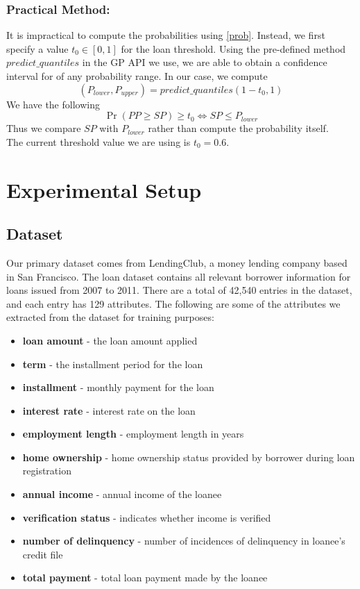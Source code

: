 \documentclass[a4paper]{article}
\theoremstyle{genius}
\begin{document}
\subsubsection{Practical Method:} It is impractical to compute the probabilities using \eqref{prob}. Instead, we first specify a value $t_0\in [0, 1]$ for the loan threshold. Using the pre-defined method $predict\_quantiles$ in the GP API we use, we are able to obtain a confidence interval for of any probability range. In our case, we compute
$$(P_{lower}, P_{upper}) = predict\_quantiles(1-t_0, 1)$$
We have the following
$$\Pr(PP \ge SP)\ge t_0 \iff SP\le P_{lower}$$
Thus we compare $SP$ with $P_{lower}$ rather than compute the probability itself.\\
The current threshold value we are using is $t_0 = 0.6$.

\section{Experimental Setup}
\subsection{Dataset}
Our primary dataset comes from LendingClub, a money lending company based in San Francisco. The loan dataset contains all relevant borrower information for loans issued from 2007 to 2011. There are a total of 42,540 entries in the dataset, and each entry has 129 attributes. The following are some of the attributes we extracted from the dataset for training purposes:

\begin{itemize}
\item[] \textbf{loan amount} - the loan amount applied
\item[] \textbf{term} - the installment period for the loan
\item[] \textbf{installment} - monthly payment for the loan
\item[] \textbf{interest rate} - interest rate on the loan
\item[] \textbf{employment length} - employment length in years
\item[] \textbf{home ownership} - home ownership status provided by borrower during loan registration
\item[] \textbf{annual income} - annual income of the loanee
\item[] \textbf{verification status} - indicates whether income is verified
\item[] \textbf{number of delinquency} - number of incidences of delinquency in loanee's credit file
\item[] \textbf{total payment} - total loan payment made by the loanee
\end{itemize}
\end{document}
